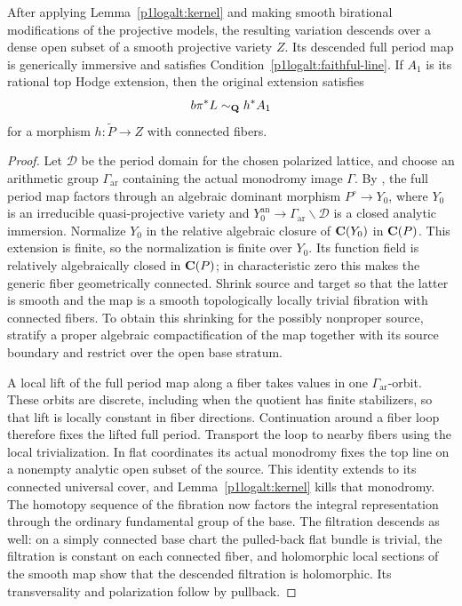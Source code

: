\begin{lemma}\label{p1logalt:descent}
After applying Lemma~\ref{p1logalt:kernel} and making smooth birational
modifications of the projective models, the resulting variation
descends over a dense open subset of a smooth projective variety $Z$.
Its descended full period map is generically immersive and satisfies
Condition~\eqref{p1logalt:faithful-line}.  If $A_1$ is its rational top Hodge
extension, then the original extension satisfies
\[
 b\pi^*L\sim_{\mathbf Q}h^*A_1
\]
for a morphism $h:\widetilde P\to Z$ with connected fibers.
\end{lemma}

\begin{proof}
Let $\mathcal D$ be the period domain for the chosen polarized lattice,
and choose an arithmetic group $\Gamma_{\mathrm{ar}}$ containing the
actual monodromy image $\Gamma$.  By \cite[Theorem 1.1]{BakkerBrunebarbeTsimerman}, the full
period map factors through an algebraic dominant morphism
$P^\circ\to Y_0$, where $Y_0$ is an irreducible quasi-projective variety
and $Y_0^{\mathrm{an}}\to\Gamma_{\mathrm{ar}}\backslash\mathcal D$ is
a closed analytic immersion.  Normalize $Y_0$ in the relative algebraic
closure of $\mathbf C(Y_0)$ in $\mathbf C(P)$.  This extension is finite, so the
normalization is finite over $Y_0$.  Its function field is relatively
algebraically closed in $\mathbf C(P)$; in characteristic zero this makes the
generic fiber geometrically connected.  Shrink
source and target so that the latter is smooth and the map is a smooth
topologically locally trivial fibration with connected fibers.  To
obtain this shrinking for the possibly nonproper source, stratify a
proper algebraic compactification of the map together with its source
boundary and restrict over the open base stratum.

A local lift of the full period map along a fiber takes values in one
$\Gamma_{\mathrm{ar}}$-orbit.  These orbits are discrete, including when
the quotient has finite stabilizers, so that lift is locally constant
in fiber directions.  Continuation around a fiber loop therefore fixes
the lifted full period.  Transport the loop to nearby fibers using the
local trivialization.  In flat coordinates its actual monodromy fixes
the top line on a nonempty analytic open subset of the source.  This
identity extends to its connected universal cover, and
Lemma~\ref{p1logalt:kernel} kills that monodromy.  The homotopy sequence of
the fibration now factors the integral representation through the
ordinary fundamental group of the base.  The filtration descends as well: on a
simply connected base chart the pulled-back flat bundle is trivial,
the filtration is constant on each connected fiber, and holomorphic
local sections of the smooth map show that the descended filtration is
holomorphic.  Its transversality and polarization follow by pullback.


\end{proof}
